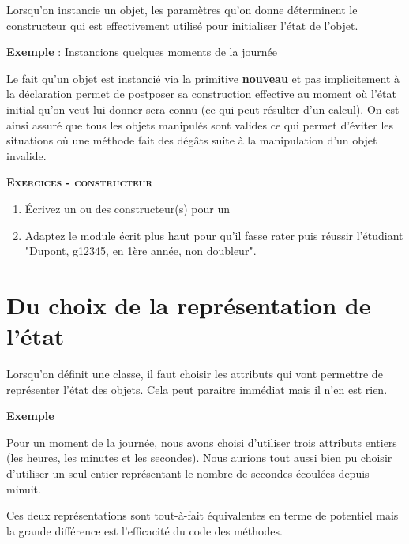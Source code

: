 Lorsqu'on instancie un objet, les paramètres
qu'on donne déterminent le constructeur qui est
effectivement utilisé pour initialiser l'état de
l'objet.

{
\textbf{Exemple} : Instancions quelques moments de la journée}


Le fait qu'un objet est instancié via la primitive
\textbf{nouveau} et pas implicitement à la déclaration permet de
postposer sa construction effective au moment où
l'état initial qu'on veut lui donner
sera connu (ce qui peut résulter d'un calcul). On est
ainsi assuré que tous les objets manipulés sont valides ce qui permet
d’éviter les situations où une méthode fait des dégâts suite à la
manipulation d’un objet invalide.

\clearpage
{}
{\sffamily\bfseries\scshape
Exercices - constructeur}

\begin{enumerate}
	\item {
		Écrivez un ou des constructeur(s) pour un }
	\item {
		Adaptez le module écrit plus haut pour qu'il fasse rater 
		puis réussir l'étudiant "Dupont, g12345, en 1ère année,
		non doubleur".}
\end{enumerate}


\section{Du choix de la représentation de l'état}

Lorsqu'on définit une classe, il faut choisir les
attributs qui vont permettre de représenter l'état des
objets. Cela peut paraitre immédiat mais il n'en est
rien.

{\bfseries
Exemple}

Pour un moment de la journée, nous avons choisi
d'utiliser trois attributs entiers (les heures, les
minutes et les secondes). Nous aurions tout aussi bien pu choisir
d'utiliser un seul entier représentant le nombre de
secondes écoulées depuis minuit.

Ces deux représentations sont tout-à-fait équivalentes en terme de
potentiel mais la grande différence est l'efficacité
du code des méthodes. 

